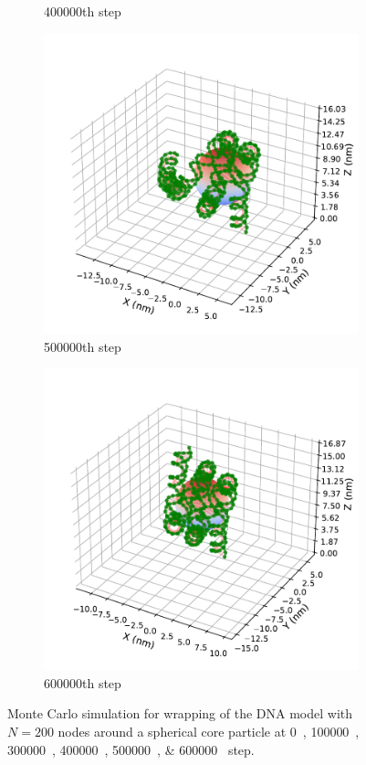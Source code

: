 \documentclass[a4paper,10pt]{article}
\begin{document}
\begin{figure}[tb]
\begin{subfigure}{.3\textwidth}
\caption{400000th step}
\label{fig:hist_c2}
\end{subfigure}
\begin{subfigure}{.3\textwidth}
\includegraphics[width=\textwidth]{hist_500000.pdf}
\caption{500000th step}
\label{fig:hist_c3}
\end{subfigure}
\begin{subfigure}{.3\textwidth}
\includegraphics[width=\textwidth]{hist_600000.pdf}
\caption{600000th step}
\label{fig:hist_d}
\end{subfigure}
\caption{Monte Carlo simulation for wrapping of the DNA model with $N=200$ nodes around a spherical core particle at \SIlist{0;100000;300000;400000;500000;600000}{} step.}
\label{fig:hist}
\end{figure}
\end{document}
